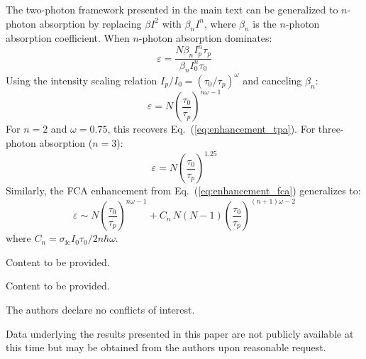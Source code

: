 \documentclass{optica-article}
\begin{document}
The two-photon framework presented in the main text can be generalized to $n$-photon absorption by replacing $\beta I^2$ with $\beta_n I^n$, where $\beta_n$ is the $n$-photon absorption coefficient. When $n$-photon absorption dominates:
\begin{equation}
\varepsilon = \frac{N \beta_n I_p^n \tau_p}{\beta_n I_0^n \tau_0}
\label{eq:generalized_enhancement}
\end{equation}
Using the intensity scaling relation $I_p/I_0 = (\tau_0/\tau_p)^\omega$ and canceling $\beta_n$:
\begin{equation}
\varepsilon = N\left(\frac{\tau_0}{\tau_p}\right)^{n\omega-1}
\label{eq:gen_simp_enh}
\end{equation}
For $n = 2$ and $\omega = 0.75$, this recovers Eq.~(\ref{eq:enhancement_tpa}). For three-photon absorption ($n = 3$):
\begin{equation}
\varepsilon = N\left(\frac{\tau_0}{\tau_p}\right)^{1.25}
\label{eq:enhancement_3pa}
\end{equation}
Similarly, the FCA enhancement from Eq.~(\ref{eq:enhancement_fca}) generalizes to:
\begin{equation}
\varepsilon \sim N\left(\frac{\tau_0}{\tau_p}\right)^{n\omega-1} + C_n\,N(N-1)\left(\frac{\tau_0}{\tau_p}\right)^{(n+1)\omega-2}
\end{equation}
where $C_n = \sigma_\text{fc} I_0 \tau_0 / 2n\hbar\omega$.

\begin{backmatter}

Content to be provided.

Content to be provided.

The authors declare no conflicts of interest.

Data underlying the results presented in this paper are not publicly available at this time but may be obtained from the authors upon reasonable request.

\end{backmatter}


\end{document}
